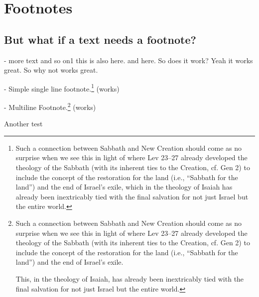\documentclass{article}
\begin{document}
	

\section{Footnotes}

\subsection{But what if a text needs a footnote?}

- more text and so on1
	this is also here. and here. So does it work? Yeah it works great. So why not works great.



- Simple single line footnote.\footnote{
	Such a connection between Sabbath and New Creation should come as no surprise when we see this in light of where Lev 23--27 already developed the theology of the Sabbath (with its inherent ties to the Creation, cf. Gen 2) to include the concept of the restoration for the land (i.e., ``Sabbath for the land'') and the end of Israel's exile, which in the theology of Isaiah has already been inextricably tied with the final salvation for not just Israel but the entire world.} (works)
	
- Multiline Footnote.\footnote{
	Such a connection between Sabbath and New Creation should come as no surprise when we see this in light of where Lev 23--27 already developed the theology of the Sabbath (with its inherent ties to the Creation, cf. Gen 2) to include the concept of the restoration for the land (i.e., ``Sabbath for the land'') and the end of Israel's exile. 
	

	This, in the theology of Isaiah, has already been inextricably tied with the final salvation for not just Israel but the entire world.} (works)

	Another test
	
\end{document}

